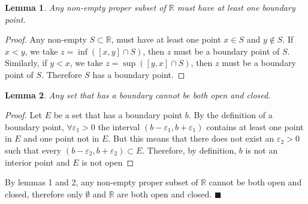 \documentclass[11pt]{article}
\def \R {\mathbb{R}}
\def \epsilon {\varepsilon}
\newtheorem{lemma}{Lemma}
\begin{document}
\begin{lemma}
	Any non-empty proper subset of $\R$ must have at least one boundary point. 
\end{lemma}

\begin{proof}
	Any non-empty $S \subset \R$, must have at least one point $x \in S$ and $y \notin S$. If $x < y$, we take $z = \inf([x, y]\cap S)$, then $z$ must be a boundary point of $S$. Similarly, if $y < x$, we take $z = \sup([y, x]\cap S)$, then $z$ must be a boundary point of $S$. Therefore $S$ has a boundary point.
\end{proof}

\begin{lemma}
	Any set that has a boundary cannot be both open and closed.
\end{lemma}

\begin{proof}
	Let $E$ be a set that has a boundary point $b$. By the definition of a boundary point, $\forall \epsilon_1 > 0$ the interval $(b - \epsilon_1, b + \epsilon_1)$ contains at least one point in $E$ and one point not in $E$. But this means that there does not exist an $\epsilon_2 > 0$ such that every $(b - \epsilon_2, b + \epsilon_2) \subset E$. Therefore, by definition, $b$ is not an interior point and $E$ is not open
\end{proof}

By lemmas 1 and 2, any non-empty proper subset of $\R$ cannot be both open and closed, therefore only $\emptyset$ and $\R$ are both open and closed. 
$\blacksquare$
\end{document}
